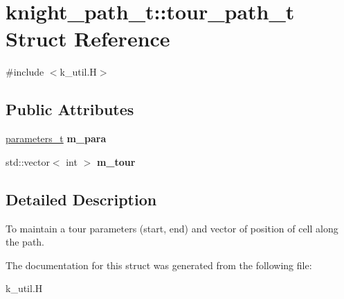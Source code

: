 \hypertarget{structknight__path__t_1_1tour__path__t}{\section{knight\-\_\-path\-\_\-t\-:\-:tour\-\_\-path\-\_\-t \-Struct \-Reference}
\label{structknight__path__t_1_1tour__path__t}
}


{\ttfamily \#include $<$k\-\_\-util.\-H$>$}

\subsection*{\-Public \-Attributes}
\begin{DoxyCompactItemize}
\item 
\hypertarget{structknight__path__t_1_1tour__path__t_a2d585c2c7b29c9e78bbc0e7cd2e66ee1}{\hyperlink{structknight__path__t_1_1parameters__t}{parameters\-\_\-t} {\bfseries m\-\_\-para}}\label{structknight__path__t_1_1tour__path__t_a2d585c2c7b29c9e78bbc0e7cd2e66ee1}

\item 
\hypertarget{structknight__path__t_1_1tour__path__t_a424c1d34a28f7ccc41cefa859b67062e}{std\-::vector$<$ int $>$ {\bfseries m\-\_\-tour}}\label{structknight__path__t_1_1tour__path__t_a424c1d34a28f7ccc41cefa859b67062e}

\end{DoxyCompactItemize}


\subsection{\-Detailed \-Description}
\-To maintain a tour parameters (start, end) and vector of position of cell along the path. 

\-The documentation for this struct was generated from the following file\-:\begin{DoxyCompactItemize}
\item 
k\-\_\-util.\-H\end{DoxyCompactItemize}
